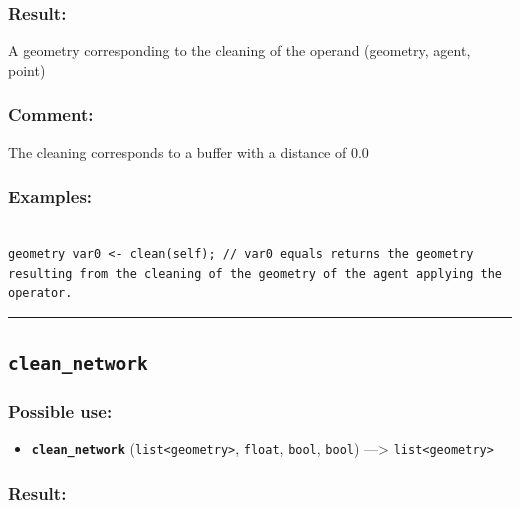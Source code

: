 \documentclass[]{book}
\providecommand{\tightlist}{%
  \setlength{\itemsep}{0pt}\setlength{\parskip}{0pt}}
\theoremstyle{definition}
\theoremstyle{definition}
\theoremstyle{definition}
\theoremstyle{remark}
\begin{document}
\subsubsection{Result:}\label{result-84}

A geometry corresponding to the cleaning of the operand (geometry,
agent, point)

\subsubsection{Comment:}\label{comment-18}

The cleaning corresponds to a buffer with a distance of 0.0

\subsubsection{Examples:}\label{examples-65}

\begin{verbatim}
 
geometry var0 <- clean(self); // var0 equals returns the geometry resulting from the cleaning of the geometry of the agent applying the operator.
\end{verbatim}

\begin{center}\rule{0.5\linewidth}{\linethickness}\end{center}

\subsection{\texorpdfstring{\texttt{clean\_network}}{clean\_network}}\label{clean_network}

\subsubsection{Possible use:}\label{possible-use-87}

\begin{itemize}
\tightlist
\item
  \textbf{\texttt{clean\_network}}
  (\texttt{list\textless{}geometry\textgreater{}}, \texttt{float},
  \texttt{bool}, \texttt{bool}) ---\textgreater{}
  \texttt{list\textless{}geometry\textgreater{}}
\end{itemize}

\subsubsection{Result:}\label{result-85}
\end{document}
